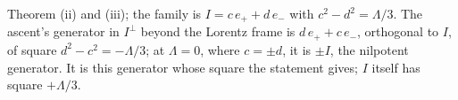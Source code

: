 Theorem (ii) and (iii); the family is $I = c\,e_{+} + d\,e_{-}$ with $c^{2} - d^{2} = \Lambda/3$. The ascent's generator in $I^{\perp}$ beyond the Lorentz frame is $d\,e_{+} + c\,e_{-}$, orthogonal to $I$, of square $d^{2} - c^{2} = -\Lambda/3$; at $\Lambda = 0$, where $c = \pm d$, it is $\pm I$, the nilpotent generator. It is this generator whose square the statement gives; $I$ itself has square $+\Lambda/3$.

